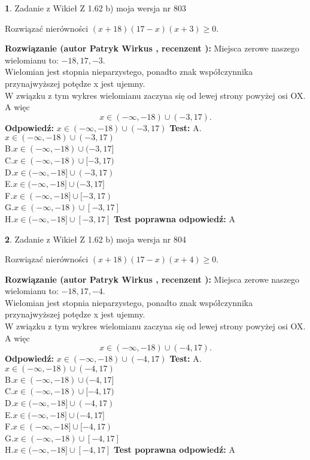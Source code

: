 \documentclass[12pt, a4paper]{article}
\theoremstyle{definition} %
\newtheorem{zad}{}
\newcommand{\zadStart}[1]{\begin{zad}#1\newline}
\newcommand{\zadStop}{\end{zad}}
\newcommand{\rozwStart}[2]{\noindent \textbf{Rozwiązanie (autor #1 , recenzent #2): }\newline}
\newcommand{\rozwStop}{\newline}
\newcommand{\odpStart}{\noindent \textbf{Odpowiedź:}\newline}
\newcommand{\odpStop}{\newline}
\newcommand{\testStart}{\noindent \textbf{Test:}\newline}
\newcommand{\testStop}{\newline}
\newcommand{\kluczStart}{\noindent \textbf{Test poprawna odpowiedź:}\newline}
\newcommand{\kluczStop}{\newline}
\begin{document}
\zadStart{Zadanie z Wikieł Z 1.62 b) moja wersja nr 803}

Rozwiązać nierówności $(x+18)(17-x)(x+3)\ge0$.
\zadStop
\rozwStart{Patryk Wirkus}{}
Miejsca zerowe naszego wielomianu to: $-18, 17, -3$.\\
Wielomian jest stopnia nieparzystego, ponadto znak współczynnika przy\linebreak najwyższej potędze x jest ujemny.\\ W związku z tym wykres wielomianu zaczyna się od lewej strony powyżej osi OX. A więc $$x \in (-\infty,-18) \cup (-3,17).$$
\rozwStop
\odpStart
$x \in (-\infty,-18) \cup (-3,17)$
\odpStop
\testStart
A.$x \in (-\infty,-18) \cup (-3,17)$\\
B.$x \in (-\infty,-18) \cup (-3,17]$\\
C.$x \in (-\infty,-18) \cup [-3,17)$\\
D.$x \in (-\infty,-18] \cup (-3,17)$\\
E.$x \in (-\infty,-18] \cup (-3,17]$\\
F.$x \in (-\infty,-18] \cup [-3,17)$\\
G.$x \in (-\infty,-18) \cup [-3,17]$\\
H.$x \in (-\infty,-18] \cup [-3,17]$
\testStop
\kluczStart
A
\kluczStop



\zadStart{Zadanie z Wikieł Z 1.62 b) moja wersja nr 804}

Rozwiązać nierówności $(x+18)(17-x)(x+4)\ge0$.
\zadStop
\rozwStart{Patryk Wirkus}{}
Miejsca zerowe naszego wielomianu to: $-18, 17, -4$.\\
Wielomian jest stopnia nieparzystego, ponadto znak współczynnika przy\linebreak najwyższej potędze x jest ujemny.\\ W związku z tym wykres wielomianu zaczyna się od lewej strony powyżej osi OX. A więc $$x \in (-\infty,-18) \cup (-4,17).$$
\rozwStop
\odpStart
$x \in (-\infty,-18) \cup (-4,17)$
\odpStop
\testStart
A.$x \in (-\infty,-18) \cup (-4,17)$\\
B.$x \in (-\infty,-18) \cup (-4,17]$\\
C.$x \in (-\infty,-18) \cup [-4,17)$\\
D.$x \in (-\infty,-18] \cup (-4,17)$\\
E.$x \in (-\infty,-18] \cup (-4,17]$\\
F.$x \in (-\infty,-18] \cup [-4,17)$\\
G.$x \in (-\infty,-18) \cup [-4,17]$\\
H.$x \in (-\infty,-18] \cup [-4,17]$
\testStop
\kluczStart
A
\kluczStop
\end{document}
